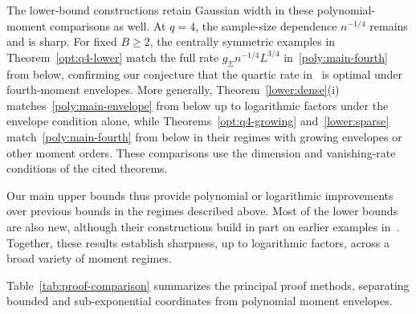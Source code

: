 \documentclass[11pt,letterpaper,twoside,leqno]{article}
\theoremstyle{bookplain}
\theoremstyle{bookremark}
\begin{document}
The lower-bound constructions retain Gaussian width in these
polynomial-moment comparisons as well. At \(q=4\), the
sample-size dependence \(n^{-1/4}\) remains and is sharp.
For fixed \(B\ge2\), the centrally symmetric examples in
Theorem~\ref{opt:q4-lower} match the full rate
\(g_\Sigma n^{-1/4}L^{3/4}\) in~\eqref{poly:main-fourth}
from below, confirming our conjecture that the quartic rate
in~\cite[Theorem~2.5]{CCKK2022} is optimal under fourth-moment
envelopes. More generally, Theorem~\ref{lower:dense}\textup{(i)}
matches~\eqref{poly:main-envelope} from below up to logarithmic
factors under the envelope condition alone, while
Theorems~\ref{opt:q4-growing} and~\ref{lower:sparse}
match~\eqref{poly:main-fourth} from below in their regimes with
growing envelopes or other moment orders. These comparisons use
the dimension and vanishing-rate conditions of the cited theorems.

Our main upper bounds thus provide polynomial or logarithmic
improvements over previous bounds in the regimes described above.
Most of the lower bounds are also new, although their constructions
build in part on earlier examples in~\cite{CCK,FKLZ}. Together,
these results establish sharpness, up to logarithmic factors,
across a broad variety of moment regimes.

Table~\ref{tab:proof-comparison} summarizes the principal proof
methods, separating bounded and sub-exponential coordinates from
polynomial moment envelopes.
\end{document}
